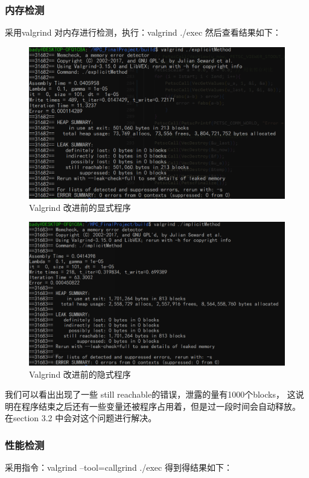 \documentclass[10pt, a4paper]{article}
\begin{document}
\subsubsection{内存检测}
采用valgrind 对内存进行检测，执行：valgrind ./exec 然后查看结果如下：
\begin{figure}[!h]
\centering
\includegraphics[scale=0.3]{img/Valgrind-pre.png}
\caption{Valgrind 改进前的显式程序}
\label{fig:1}
\end{figure}
\begin{figure}[!h]
\centering
\includegraphics[scale=0.3]{img/Valgrind-pre2.png}
\caption{Valgrind 改进前的隐式程序}
\label{fig:1}
\end{figure}
我们可以看出出现了一些 still reachable的错误，泄露的量有1000个blocks，
这说明在程序结束之后还有一些变量还被程序占用着，但是过一段时间会自动释放。
在section 3.2 中会对这个问题进行解决。
\subsubsection{性能检测}
采用指令：valgrind --tool=callgrind ./exec 得到得结果如下：
\end{document}
